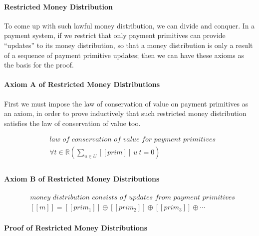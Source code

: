 \paragraph{Restricted Money Distribution}

To come up with such lawful money distribution, we can divide and conquer. In a payment system, if
we restrict that only payment primitives can provide ``updates'' to its money distribution, so that
a money distribution is only a result of a sequence of payment primitive updates; then we can have
these axioms as the basis for the proof.

\paragraph{Axiom A of Restricted Money Distributions}

First we must impose the law of conservation of value on payment primitives as an axiom, in order to
prove inductively that such restricted money distribution satisfies the law of conservation of value
too.

\begin{equation}
    \begin{split}
        &\textit{law of conservation of value for payment primitives} \\
        &\forall t \in \mathbb{R} ({\displaystyle \sum_{u \in U} [\![prim]\!]\ u\ t = 0}) \\
    \end{split}
\end{equation}

\paragraph{Axiom B of Restricted Money Distributions}

\begin{equation}
    \begin{split}
        &\textit{money distribution consists of updates from payment primitives} \\
        &[\![m]\!] = [\![prim_1]\!] \oplus [\![prim_2]\!] \oplus [\![prim_3]\!] \oplus \dotsb
    \end{split}
\end{equation}

\paragraph{Proof of Restricted Money Distributions}

